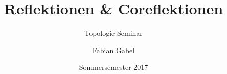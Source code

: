 \title[Topologie Seminar]{\huge{Reflektionen \& Coreflektionen}}
\subtitle{Topologie Seminar}
\date[Sommersemester 2017]{Sommersemester 2017}
\author[F. Gabel]{Fabian Gabel}
